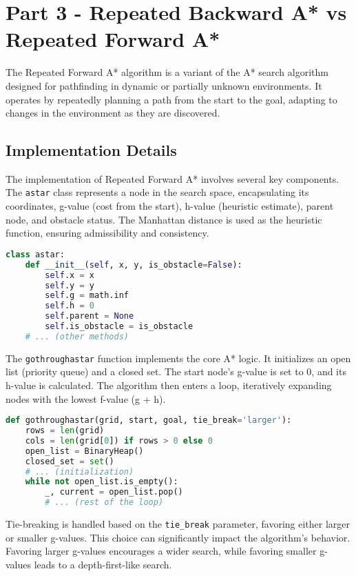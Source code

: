 \documentclass[12pt]{article}
\begin{document}
\section{Part 3 - Repeated Backward A* vs Repeated Forward A*}

The Repeated Forward A* algorithm is a variant of the A* search algorithm designed for pathfinding in dynamic or partially unknown environments. It operates by repeatedly planning a path from the start to the goal, adapting to changes in the environment as they are discovered.

\subsection{Implementation Details}

The implementation of Repeated Forward A* involves several key components. The \texttt{astar} class represents a node in the search space, encapsulating its coordinates, g-value (cost from the start), h-value (heuristic estimate), parent node, and obstacle status. The Manhattan distance is used as the heuristic function, ensuring admissibility and consistency.

\begin{lstlisting}[language=Python, basicstyle=\ttfamily]
class astar:
    def __init__(self, x, y, is_obstacle=False):
        self.x = x
        self.y = y
        self.g = math.inf
        self.h = 0
        self.parent = None
        self.is_obstacle = is_obstacle
    # ... (other methods)
\end{lstlisting}

The \texttt{gothroughastar} function implements the core A* logic. It initializes an open list (priority queue) and a closed set. The start node's g-value is set to 0, and its h-value is calculated. The algorithm then enters a loop, iteratively expanding nodes with the lowest f-value (g + h).

\begin{lstlisting}[language=Python, basicstyle=\ttfamily]
def gothroughastar(grid, start, goal, tie_break='larger'):
    rows = len(grid)
    cols = len(grid[0]) if rows > 0 else 0
    open_list = BinaryHeap()
    closed_set = set()
    # ... (initialization)
    while not open_list.is_empty():
        _, current = open_list.pop()
        # ... (rest of the loop)
\end{lstlisting}

Tie-breaking is handled based on the \texttt{tie\_break} parameter, favoring either larger or smaller g-values. This choice can significantly impact the algorithm's behavior. Favoring larger g-values encourages a wider search, while favoring smaller g-values leads to a depth-first-like search.
\end{document}
